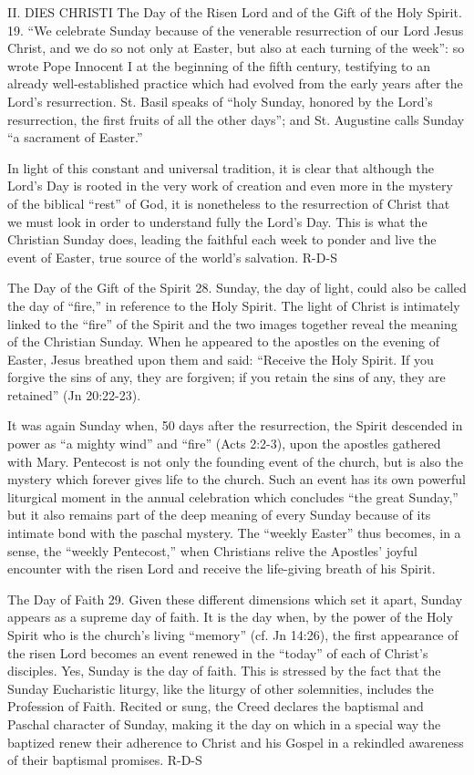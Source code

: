 \documentclass[oneside]{book}
\begin{document}
II. DIES CHRISTI
The Day of the Risen Lord and of the Gift of the Holy Spirit.
19. ``We celebrate Sunday because of the venerable resurrection of our Lord
Jesus Christ, and we do so not only at Easter, but also at each turning of the
week'': so wrote Pope Innocent I at the beginning of the fifth century,
testifying to an already well-established practice which had evolved from the
early years after the Lord's resurrection. St. Basil speaks of ``holy Sunday,
honored by the Lord's resurrection, the first fruits of all the other days'';
and St. Augustine calls Sunday ``a sacrament of Easter.''

In light of this constant and universal tradition, it is clear that although the
Lord's Day is rooted in the very work of creation and even more in the mystery
of the biblical ``rest'' of God, it is nonetheless to the resurrection of Christ
that we must look in order to understand fully the Lord's Day. This is what the
Christian Sunday does, leading the faithful each week to ponder and live the
event of Easter, true source of the world's salvation.
R-D-S




The Day of the Gift of the Spirit
28. Sunday, the day of light, could also be called the day of ``fire,'' in
reference to the Holy Spirit. The light of Christ is intimately linked to the
``fire'' of the Spirit and the two images together reveal the meaning of the
Christian Sunday. When he appeared to the apostles on the evening of Easter,
Jesus breathed upon them and said: ``Receive the Holy Spirit. If you forgive the
sins of any, they are forgiven; if you retain the sins of any, they are
retained'' (Jn 20:22-23).

It was again Sunday when, 50 days after the resurrection, the Spirit descended
in power as ``a mighty wind'' and ``fire'' (Acts 2:2-3), upon the apostles
gathered with Mary. Pentecost is not only the founding event of the church, but
is also the mystery which forever gives life to the church. Such an event has
its own powerful liturgical moment in the annual celebration which concludes
``the great Sunday,'' but it also remains part of the deep meaning of every
Sunday because of its intimate bond with the paschal mystery. The ``weekly
Easter'' thus becomes, in a sense, the ``weekly Pentecost,'' when Christians
relive the Apostles' joyful encounter with the risen Lord and receive the
life-giving breath of his Spirit.

The Day of Faith
29. Given these different dimensions which set it apart, Sunday appears as a
supreme day of faith. It is the day when, by the power of the Holy Spirit who is
the church's living ``memory'' (cf. Jn 14:26), the first appearance of the risen
Lord becomes an event renewed in the ``today'' of each of Christ's
disciples. Yes, Sunday is the day of faith. This is stressed by the fact that
the Sunday Eucharistic liturgy, like the liturgy of other solemnities, includes
the Profession of Faith. Recited or sung, the Creed declares the baptismal and
Paschal character of Sunday, making it the day on which in a special way the
baptized renew their adherence to Christ and his Gospel in a rekindled awareness
of their baptismal promises.
R-D-S
\end{document}
